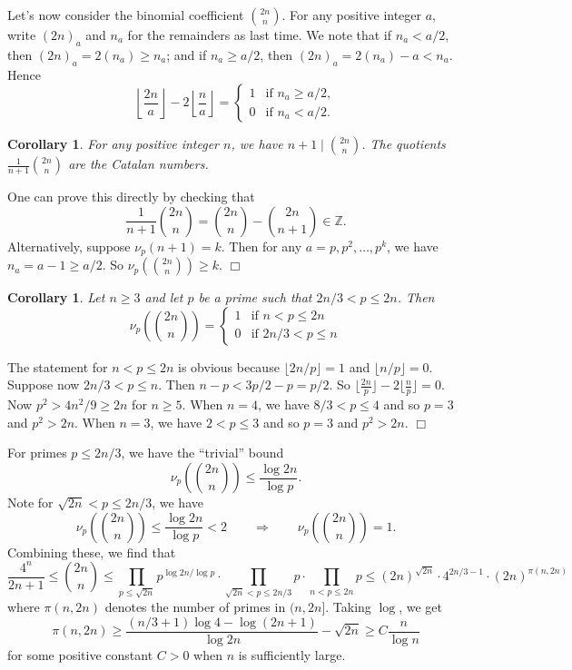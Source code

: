 \documentclass{article}
\def\Z{{\mathbb Z}}
\def\Z{{\mathbb Z}}
\newtheorem{cor}[subsection]{Corollary}
\newenvironment{proof}{\noindent {\bf Proof:}}{$\Box$ \vspace{2 ex}}
\begin{document}
Let's now consider the binomial coefficient $\displaystyle\binom{2n}{n}$. For any positive integer $a$, write $(2n)_a$ and $n_a$ for the remainders as last time. We note that if $n_a < a/2$, then $(2n)_a = 2(n_a) \geq n_a$; and if $n_a \geq a/2$, then $(2n)_a = 2(n_a) - a < n_a$. Hence
$$\left\lfloor\frac{2n}{a}\right\rfloor - 2\left\lfloor\frac{n}{a}\right\rfloor = \begin{cases}
        1&\mbox{if }n_a \geq a/2,\\
        0&\mbox{if }n_a < a/2.
    \end{cases}$$

\begin{cor}
    For any positive integer $n$, we have $\displaystyle n+1 \mid \binom{2n}{n}$. The quotients $\displaystyle\frac{1}{n+1}\binom{2n}{n}$ are the Catalan numbers.
\end{cor}

\begin{proof}
    One can prove this directly by checking that
    $$\frac{1}{n+1}\binom{2n}{n} = \binom{2n}{n} - \binom{2n}{n+1} \in\Z.$$
    Alternatively, suppose $\nu_p(n+1) = k$. Then for any $a = p,p^2,\ldots,p^k$, we have $n_a = a - 1\geq a/2$. So $\nu_p(\binom{2n}{n}) \geq k.$
\end{proof}

\begin{cor}
    Let $n\geq3$ and let $p$ be a prime such that $2n/3 < p \leq 2n$. Then
    $$\nu_p\left(\binom{2n}{n}\right) = \begin{cases}
        1&\mbox{if }n < p \leq 2n\\
        0&\mbox{if }2n/3 < p \leq n
    \end{cases}$$
\end{cor}

\begin{proof}
    The statement for $n<p\leq 2n$ is obvious because $\lfloor 2n/p\rfloor = 1$ and $\lfloor n/p\rfloor = 0$. Suppose now $2n/3 < p \leq n$. Then $n-p <3p/2-p = p/2$. So $\lfloor\frac{2n}{p}\rfloor - 2\lfloor\frac{n}{p}\rfloor = 0$. Now $p^2 > 4n^2/9 \geq 2n$ for $n\geq 5.$ When $n = 4$, we have $8/3 < p \leq 4$ and so $p = 3$ and $p^2 > 2n$. When $n = 3$, we have $2 < p \leq 3$ and so $p = 3$ and $p^2 > 2n$. 
\end{proof}

For primes $p \leq 2n/3$, we have the ``trivial'' bound
$$\nu_p\left(\binom{2n}{n}\right) \leq \frac{\log 2n}{\log p}.$$
Note for $\sqrt{2n}<p\leq 2n/3$, we have 
$$\nu_p\left(\binom{2n}{n}\right) \leq \frac{\log 2n}{\log p} < 2\qquad\Longrightarrow\qquad \nu_p\left(\binom{2n}{n}\right) = 1.$$
Combining these, we find that
$$\frac{4^n}{2n+1}\leq \binom{2n}{n} \leq \prod_{p\leq \sqrt{2n}} p^{\log 2n/\log p} \cdot \prod_{\sqrt{2n} < p\leq 2n/3} p\cdot\prod_{n < p \leq 2n}p \leq (2n)^{\sqrt{2n}} \cdot 4^{2n/3-1} \cdot (2n)^{\pi(n,2n)}$$
where $\pi(n,2n)$ denotes the number of primes in $(n, 2n]$. Taking $\log$, we get
$$\pi(n, 2n) \geq \frac{(n/3+1)\log 4 - \log(2n+1)}{\log 2n} - \sqrt{2n} \geq C \frac{n}{\log n}$$
for some positive constant $C>0$ when $n$ is sufficiently large.
\end{document}
